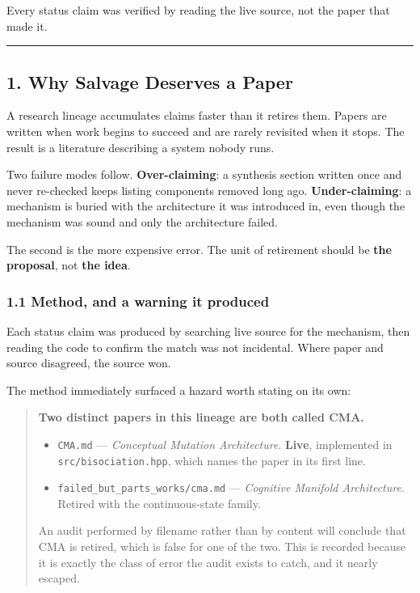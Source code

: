 \documentclass[
  11pt,
  a4paper,
]{article}
\providecommand{\tightlist}{%
  \setlength{\itemsep}{0pt}\setlength{\parskip}{0pt}}
\begin{document}
Every status claim was verified by reading the live source, not the
paper that made it.

\begin{center}\rule{0.5\linewidth}{0.5pt}\end{center}

\subsection{1. Why Salvage Deserves a
Paper}\label{why-salvage-deserves-a-paper}

A research lineage accumulates claims faster than it retires them.
Papers are written when work begins to succeed and are rarely revisited
when it stops. The result is a literature describing a system nobody
runs.

Two failure modes follow. \textbf{Over-claiming}: a synthesis section
written once and never re-checked keeps listing components removed long
ago. \textbf{Under-claiming}: a mechanism is buried with the
architecture it was introduced in, even though the mechanism was sound
and only the architecture failed.

The second is the more expensive error. The unit of retirement should be
\textbf{the proposal}, not \textbf{the idea}.

\subsubsection{1.1 Method, and a warning it
produced}\label{method-and-a-warning-it-produced}

Each status claim was produced by searching live source for the
mechanism, then reading the code to confirm the match was not
incidental. Where paper and source disagreed, the source won.

The method immediately surfaced a hazard worth stating on its own:

\begin{quote}
\textbf{Two distinct papers in this lineage are both called CMA.}

\begin{itemize}
\tightlist
\item
  \texttt{CMA.md} --- \emph{Conceptual Mutation Architecture}.
  \textbf{Live}, implemented in \texttt{src/bisociation.hpp}, which
  names the paper in its first line.
\item
  \texttt{failed\_but\_parts\_works/cma.md} --- \emph{Cognitive Manifold
  Architecture}. Retired with the continuous-state family.
\end{itemize}

An audit performed by filename rather than by content will conclude that
CMA is retired, which is false for one of the two. This is recorded
because it is exactly the class of error the audit exists to catch, and
it nearly escaped.
\end{quote}
\end{document}
